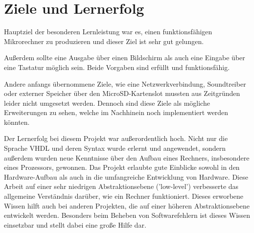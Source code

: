 \section{Ziele und Lernerfolg}
Hauptziel der besonderen Lernleistung war es, einen funktionsfähigen
Mikrorechner zu produzieren und dieser Ziel ist sehr gut gelungen.

Außerdem sollte eine Ausgabe über einen Bildschirm als auch eine Eingabe über
eine Tastatur möglich sein. Beide Vorgaben sind erfüllt und funktionsfähig.

Andere anfangs übernommene Ziele, wie eine Netzwerkverbindung, Soundtreiber oder
externer Speicher über den MicroSD-Kartenslot mussten aus Zeitgründen leider
nicht umgesetzt werden. Dennoch sind diese Ziele als mögliche Erweiterungen zu
sehen, welche im Nachhinein noch implementiert werden könnten.

Der Lernerfolg bei diesem Projekt war außerordentlich hoch. Nicht nur die
Sprache VHDL und deren Syntax wurde erlernt und angewendet, sondern außerdem
wurden neue Kenntnisse über den Aufbau eines Rechners, insbesondere eines
Prozessors, gewonnen. Das Projekt erlaubte gute Einblicke sowohl in den
Hardware-Aufbau als auch in die umfangreiche Entwicklung von Hardware. Diese
Arbeit auf einer sehr niedrigen Abstraktionsebene ('low-level') verbesserte das
allgemeine Verständnis darüber, wie ein Rechner funktioniert. Dieses erworbene
Wissen hilft auch bei anderen Projekten, die auf einer höheren Abstraktionsebene
entwickelt werden. Besonders beim Beheben von Softwarefehlern ist dieses Wissen
einsetzbar und stellt dabei eine große Hilfe dar.

\pagebreak
